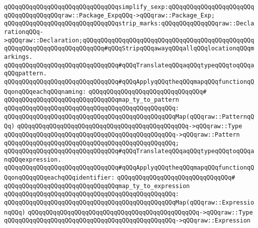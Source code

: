 \verb|qQQqqQQqqQQqqQQqqQQqqQQqqQQqqQQqsimplify_sexp:qQQqqQQqqQQqqQQqqQQqqQQqqQQqqQQqqQQqqQQqraw::Package_ExpqQQq->qQQqraw::Package_Exp;|\newline
\newline
\verb|qQQqqQQqqQQqqQQqqQQqqQQqqQQqqQQqstrip_marks:qQQqqQQqqQQqqQQqraw::DeclarationqQQq->qQQqraw::Declaration;qQQqqQQqqQQqqQQqqQQqqQQqqQQqqQQqqQQqqQQqqQQqqQQqqQQqqQQqqQQqqQQqqQQqqQQqqQQq#qQQqStripqQQqawayqQQqallqQQqlocationqQQqmarkings.|\newline
\newline
\verb|qQQqqQQqqQQqqQQqqQQqqQQqqQQqqQQq#qQQqTranslateqQQqaqQQqtypeqQQqtoqQQqaqQQqpattern.|\newline
\verb|qQQqqQQqqQQqqQQqqQQqqQQqqQQqqQQq#qQQqApplyqQQqtheqQQqmapqQQqfunctionqQQqonqQQqeachqQQqnaming:|\newline
\verb|qQQqqQQqqQQqqQQqqQQqqQQqqQQqqQQq#|\newline
\verb|qQQqqQQqqQQqqQQqqQQqqQQqqQQqqQQqmap_ty_to_pattern|\newline
\verb|qQQqqQQqqQQqqQQqqQQqqQQqqQQqqQQqqQQqqQQqqQQqqQQq:|\newline
\verb|qQQqqQQqqQQqqQQqqQQqqQQqqQQqqQQqqQQqqQQqqQQqqQQqMap(qQQqraw::PatternqQQq)|\newline
\verb|qQQqqQQqqQQqqQQqqQQqqQQqqQQqqQQqqQQqqQQqqQQqqQQq->qQQqraw::Type|\newline
\verb|qQQqqQQqqQQqqQQqqQQqqQQqqQQqqQQqqQQqqQQqqQQqqQQq->qQQqraw::Pattern|\newline
\verb|qQQqqQQqqQQqqQQqqQQqqQQqqQQqqQQqqQQqqQQqqQQqqQQq;|\newline
\newline
\verb|qQQqqQQqqQQqqQQqqQQqqQQqqQQqqQQq#qQQqTranslateqQQqaqQQqtypeqQQqtoqQQqanqQQqexpression.|\newline
\verb|qQQqqQQqqQQqqQQqqQQqqQQqqQQqqQQq#qQQqApplyqQQqtheqQQqmapqQQqfunctionqQQqonqQQqqQQqeachqQQqidentifier:|\newline
\verb|qQQqqQQqqQQqqQQqqQQqqQQqqQQqqQQq#|\newline
\verb|qQQqqQQqqQQqqQQqqQQqqQQqqQQqqQQqmap_ty_to_expression|\newline
\verb|qQQqqQQqqQQqqQQqqQQqqQQqqQQqqQQqqQQqqQQqqQQqqQQq:|\newline
\verb|qQQqqQQqqQQqqQQqqQQqqQQqqQQqqQQqqQQqqQQqqQQqqQQqMap(qQQqraw::ExpressionqQQq)|\newline
\verb|qQQqqQQqqQQqqQQqqQQqqQQqqQQqqQQqqQQqqQQqqQQqqQQq->qQQqraw::Type|\newline
\verb|qQQqqQQqqQQqqQQqqQQqqQQqqQQqqQQqqQQqqQQqqQQqqQQq->qQQqraw::Expression|\newline
